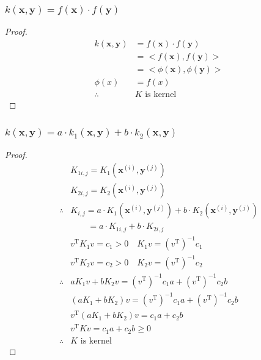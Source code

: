 \documentclass[a4paper]{article}
\begin{document}
\subsubsection{$k(\mathbf{x},\mathbf{y})=f(\mathbf{x})\cdot f(\mathbf{y})$}

\begin{proof}
    \begin{align*}
        k(\mathbf{x},\mathbf{y})&=f(\mathbf{x})\cdot f(\mathbf{y})\\
        &=<f(\mathbf{x}),f(\mathbf{y})>\\
        &=<\phi(\mathbf{x}),\phi(\mathbf{y})>\\
        \phi(x)&=f(x)\\
        \therefore&K\text{ is kernel}
    \end{align*}
\end{proof}

\subsubsection{$k(\mathbf{x},\mathbf{y})=a\cdot k_1(\mathbf{x},\mathbf{y})+b\cdot k_2(\mathbf{x},\mathbf{y})$}

\begin{proof}
    \begin{align*}
        &K_{1 i,j}=K_1(\mathbf{x}^{(i)},\mathbf{y}^{(j)})\\
        &K_{2 i,j}=K_2(\mathbf{x}^{(i)},\mathbf{y}^{(j)})\\
        \therefore&K_{i,j}=a\cdot K_1(\mathbf{x}^{(i)},\mathbf{y}^{(j)})+b\cdot K_2(\mathbf{x}^{(i)},\mathbf{y}^{(j)})\\
        &\quad\quad=a\cdot K_{1 i,j}+b\cdot K_{2 i,j}\\
        &v^\mathrm{T}K_1v=c_1>0\quad K_1v=(v^\mathrm{T})^{-1}c_1\\
        &v^\mathrm{T}K_2v=c_2>0\quad K_2v=(v^\mathrm{T})^{-1}c_2\\
        \therefore& aK_1v+bK_2v=(v^\mathrm{T})^{-1}c_1a+(v^\mathrm{T})^{-1}c_2b\\
        &(aK_1+bK_2)v=(v^\mathrm{T})^{-1}c_1a+(v^\mathrm{T})^{-1}c_2b\\
        &v^\mathrm{T}(aK_1+bK_2)v=c_1a+c_2b\\
        &v^\mathrm{T}Kv=c_1a+c_2b\ge0\\
        \therefore&K\text{ is kernel}
    \end{align*}
\end{proof}
\end{document}
